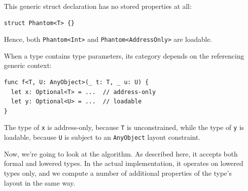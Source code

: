 \documentclass[../generics]{subfiles}
\begin{document}
\begin{example}
This generic struct declaration has no stored properties at all:
\begin{Verbatim}
struct Phantom<T> {}
\end{Verbatim}
Hence, both \texttt{Phantom<Int>} and \texttt{Phantom<AddressOnly>} are loadable.
\end{example}

\begin{example}
When a type contains type parameters, its category depends on the referencing generic context:
\begin{Verbatim}
func f<T, U: AnyObject>(_ t: T, _ u: U) {
  let x: Optional<T> = ...  // address-only
  let y: Optional<U> = ...  // loadable
}
\end{Verbatim}
The type of \texttt{x} is address-only, because \texttt{T} is unconstrained, while the type of \texttt{y} is loadable, because \texttt{U} is subject to an \texttt{AnyObject} layout constraint.
\end{example}

Now, we're going to look at the algorithm. As described here, it accepts both formal and lowered types. In the actual implementation, it operates on lowered types only, and we compute a number of additional properties of the type's layout in the same way.
\end{document}
